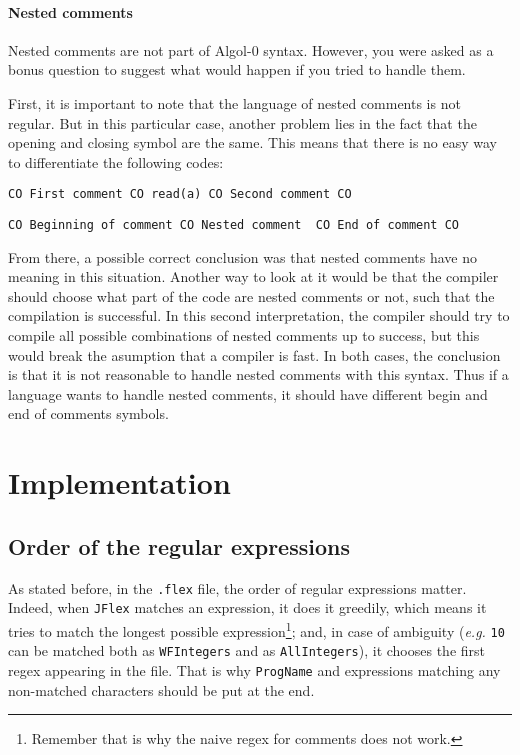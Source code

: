 \documentclass[a4paper]{article}
\newcommand{\mylanguage}{{\sc Algol-${0}$}\xspace}
\newcommand{\JFlex}{\texttt{JFlex}\xspace}
\begin{document}
\paragraph{Nested comments}
Nested comments are not part of \mylanguage syntax. However, you were asked as a bonus question to suggest what would happen if you tried to handle them.

First, it is important to note that the language of nested comments is not regular. But in this particular case, another problem lies in the fact that the opening and closing symbol are the same.
This means that there is no easy way to differentiate the following codes:

\begin{verbatim}
CO First comment CO read(a) CO Second comment CO
\end{verbatim}


\begin{verbatim}
CO Beginning of comment CO Nested comment  CO End of comment CO
\end{verbatim}

From there, a possible correct conclusion was that nested comments have no meaning in this situation. Another way to look at it would be that the compiler should choose what part of the code are nested comments or not, such that the compilation is successful. In this second interpretation, the compiler should try to compile all possible combinations of nested comments up to success, but this would break the asumption that a compiler is fast. In both cases, the conclusion is that it is not reasonable to handle nested comments with this syntax. Thus if a language wants to handle nested comments, it should have different begin and end of comments symbols.


\section{Implementation}

\subsection{Order of the regular expressions}

As stated before, in the \texttt{.flex} file, the order of regular expressions matter. Indeed, when \JFlex matches an expression, it does it greedily, which means it tries to match the longest possible expression\footnote{Remember that is why the naive regex for comments does not work.}; and, in case of ambiguity (\emph{e.g.} \texttt{10} can be matched both as \texttt{WFIntegers} and as \texttt{AllIntegers}), it chooses the first regex appearing in the file. That is why \texttt{ProgName} and expressions matching any non-matched characters should be put at the end.
\end{document}
